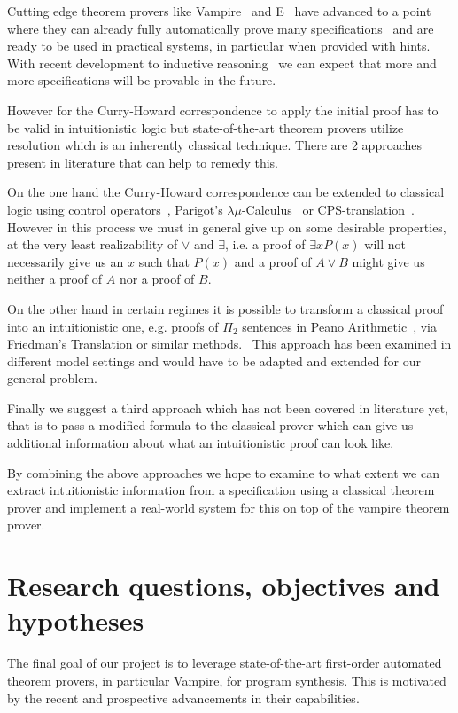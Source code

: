 \documentclass[onehalfspacing]{article}
\begin{document}
	Cutting edge theorem provers like Vampire~\cite{Vampire1} and E~\cite{E1} have advanced to a point where they can already fully automatically prove many specifications~\cite{CASC} and are ready to be used in practical systems, in particular when provided with hints. With recent development to inductive reasoning~\cite{Vampire2}\cite{Vampire3} we can expect that more and more specifications will be provable in the future.
	
	However for the Curry-Howard correspondence to apply the initial proof has to be valid in intuitionistic logic but state-of-the-art theorem provers utilize resolution which is an inherently classical technique. There are 2 approaches  present in literature that can help to remedy this.
	
	On the one hand the Curry-Howard correspondence can be extended to classical logic using control operators~\cite{Control1}, Parigot's $\lambda\mu$-Calculus~\cite{Parigot1} or CPS-translation~\cite{CPS1}. However in this process we must in general give up on some desirable properties, at the very least realizability of $\vee$ and $\exists$, i.e. a proof of $\exists xP(x)$ will not necessarily give us an $x$ such that $P(x)$ and a proof of $A\vee B$ might give us neither a proof of $A$ nor a proof of $B$.
	
	On the other hand in certain regimes it is possible to transform a classical proof into an intuitionistic one, e.g. proofs of $\Pi_2$ sentences in Peano Arithmetic~\cite{HAPA}, via Friedman's Translation or similar methods.~\cite{Friedman} This approach has been examined in different model settings and would have to be adapted and extended for our general problem.
	
	Finally we suggest a third approach which has not been covered in literature yet, that is to pass a modified formula to the classical prover which can give us additional information about what an intuitionistic proof can look like.
	
	By combining the above approaches we hope to examine to what extent we can extract intuitionistic information from a specification using a classical theorem prover and implement a real-world system for this on top of the vampire theorem prover.
	
	\section{Research questions, objectives and hypotheses}
	
	The final goal of our project is to leverage state-of-the-art first-order automated theorem provers, in particular Vampire, for program synthesis. This is motivated by the recent and prospective advancements in their capabilities.
	
\end{document}
